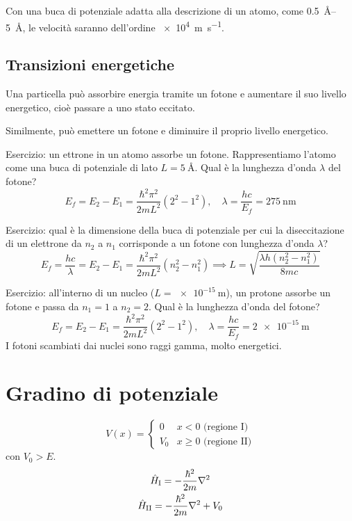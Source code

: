 Con una buca di potenziale adatta alla descrizione di un atomo, come \qtyrange{0.5}{5}{\angstrom}, le velocità saranno dell'ordine \qty{e4}{\metre\per\second}.

\subsection{Transizioni energetiche}

Una particella può assorbire energia tramite un fotone e aumentare il suo livello energetico, cioè passare a uno stato eccitato.

Similmente, può emettere un fotone e diminuire il proprio livello energetico.

Esercizio: un ettrone in un atomo assorbe un fotone.
Rappresentiamo l'atomo come una buca di potenziale di lato $L = \qty{5}{\angstrom}$.
Qual è la lunghezza d'onda $\lambda$ del fotone?
\begin{equation}
    E_f = E_2 - E_1 = \frac{\hbar^2 \pi^2}{2 m L^2} (2^2 - 1^2), \quad
    \lambda = \frac{h c}{E_f} = \qty{275}{\nano\metre}
\end{equation}

Esercizio: qual è la dimensione della buca di potenziale per cui la diseccitazione di un elettrone da $n_2$ a $n_1$ corrisponde a un fotone con lunghezza d'onda $\lambda$?
\begin{equation}
    E_f = \frac{h c}{\lambda} = E_2 - E_1 = \frac{\hbar^2 \pi^2}{2 m L^2} (n_2^2 - n_1^2)
    \implies
    L = \sqrt{\frac{\lambda h (n_2^2 - n_1^2)}{8 m c}}
\end{equation}

Esercizio: all'interno di un nucleo ($L = \qty{e-15}{\metre}$), un protone assorbe un fotone e passa da $n_1 = 1$ a $n_2 = 2$.
Qual è la lunghezza d'onda del fotone?
\begin{equation}
    E_f = E_2 - E_1 = \frac{\hbar^2 \pi^2}{2 m L^2} (2^2 - 1^2), \quad
    \lambda = \frac{h c}{E_f} = \qty{2e-15}{\metre}
\end{equation}
I fotoni scambiati dai nuclei sono raggi gamma, molto energetici.

\section{Gradino di potenziale}

\begin{equation}
    V(x) = \begin{cases}
        0 & x < 0 \text{ (regione I)} \\
        V_0 & x \ge 0 \text{ (regione II)}
    \end{cases}
\end{equation}
con $V_0 > E$.
\begin{subequations}
\begin{gather}
    \hat{H}_\mathrm{I} = -\dfrac{\hbar^2}{2 m} \nabla^2 \\
    \hat{H}_\mathrm{II} = -\dfrac{\hbar^2}{2 m} \nabla^2 + V_0
\end{gather}
\end{subequations}

